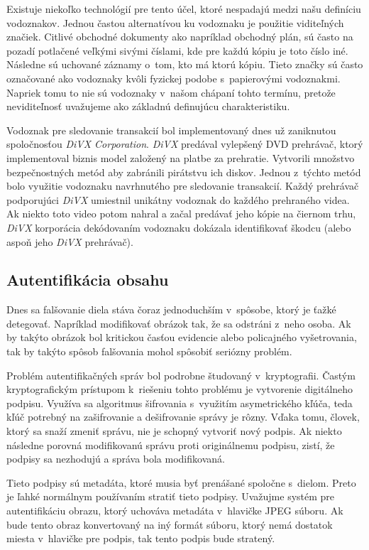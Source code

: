 Existuje niekoľko technológií pre tento účel, ktoré nespadajú medzi našu definíciu vodoznakov. Jednou častou alternatívou ku vodoznaku je použitie viditeľných značiek. Citlivé obchodné dokumenty ako napríklad obchodný plán, sú často na pozadí potlačené veľkými sivými číslami, kde pre každú kópiu je toto číslo iné. Následne sú uchované záznamy o~tom, kto má ktorú kópiu. Tieto značky sú často označované ako vodoznaky kvôli fyzickej podobe s~papierovými vodoznakmi. Napriek tomu to nie sú vodoznaky v~našom chápaní tohto termínu, pretože neviditeľnosť uvažujeme ako základnú definujúcu charakteristiku.

Vodoznak pre sledovanie transakcií bol implementovaný dnes už zaniknutou spoločnosťou {\it DiVX Corporation}. {\it DiVX} predával vylepšený DVD prehrávač, ktorý implementoval biznis model založený na platbe za prehratie. Vytvorili množstvo bezpečnostných metód aby zabránili pirátstvu ich diskov. Jednou z~týchto metód bolo využitie vodoznaku navrhnutého pre sledovanie transakcií. Každý prehrávač podporujúci {\it DiVX} umiestnil unikátny vodoznak do každého prehraného videa. Ak niekto toto video potom nahral a začal predávať jeho kópie na čiernom trhu, {\it DiVX} korporácia dekódovaním vodoznaku dokázala identifikovať škodcu (alebo aspoň jeho {\it DiVX} prehrávač). \cite{Cox}

\subsection{Autentifikácia obsahu}
Dnes sa falšovanie diela stáva čoraz jednoduchším v~spôsobe, ktorý je ťažké detegovať. Napríklad modifikovať obrázok tak, že sa odstráni z~neho osoba. Ak by takýto obrázok bol kritickou časťou evidencie alebo policajného vyšetrovania, tak by takýto spôsob falšovania mohol spôsobiť seriózny problém.

Problém autentifikačných správ bol podrobne študovaný v~kryptografii. Častým kryptografickým prístupom k~riešeniu tohto problému je vytvorenie digitálneho podpisu. Využíva sa algoritmus šifrovania s~využitím asymetrického kľúča, teda kľúč potrebný na zašifrovanie a dešifrovanie správy je rôzny. Vďaka tomu, človek, ktorý sa snaží zmeniť správu, nie je schopný vytvoriť nový podpis. Ak niekto následne porovná modifikovanú správu proti originálnemu podpisu, zistí, že podpisy sa nezhodujú a správa bola modifikovaná.

Tieto podpisy sú metadáta, ktoré musia byť prenášané spoločne s~dielom. Preto je ľahké normálnym používaním stratiť tieto podpisy. Uvažujme systém pre autentifikáciu obrazu, ktorý uchováva metadáta v~hlavičke JPEG súboru. Ak bude tento obraz konvertovaný na iný formát súboru, ktorý nemá dostatok miesta v~hlavičke pre podpis, tak tento podpis bude stratený.

